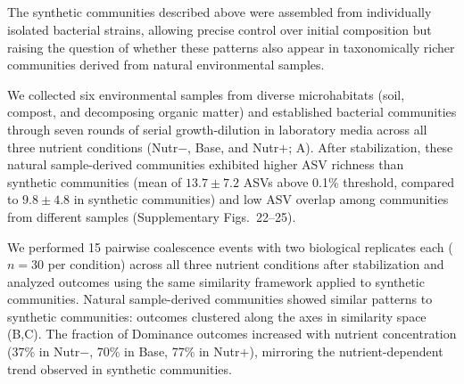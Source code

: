 \subsection{\texorpdfstring{}{Interaction-dependent coalescence outcomes in natural sample-derived communities}}
\label{sec:results:natural_communities}

The synthetic communities described above were assembled from individually isolated bacterial strains, allowing precise control over initial composition but raising the question of whether these patterns also appear in taxonomically richer communities derived from natural environmental samples. 

We collected six environmental samples from diverse microhabitats (soil, compost, and decomposing organic matter) and established bacterial communities through seven rounds of serial growth-dilution in laboratory media across all three nutrient conditions (Nutr$-$, Base, and Nutr$+$; A). After stabilization, these natural sample-derived communities exhibited higher ASV richness than synthetic communities (mean of $13.7 \pm 7.2$ ASVs above 0.1\% threshold, compared to $9.8 \pm 4.8$ in synthetic communities) and low ASV overlap among communities from different samples (Supplementary Figs.~22–25).

We performed 15 pairwise coalescence events with two biological replicates each ($n = 30$ per condition) across all three nutrient conditions after stabilization and analyzed outcomes using the same similarity framework applied to synthetic communities. Natural sample-derived communities showed similar patterns to synthetic communities: outcomes clustered along the axes in similarity space (B,C). The fraction of Dominance outcomes increased with nutrient concentration (37\% in Nutr$-$, 70\% in Base, 77\% in Nutr$+$), mirroring the nutrient-dependent trend observed in synthetic communities. 

